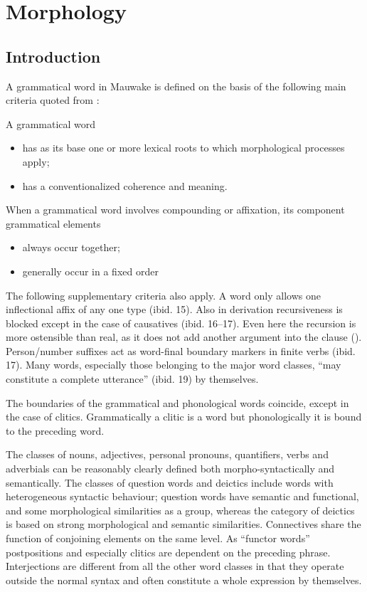 
\chapter{Morphology}\label{sec:3}
{}
\section{Introduction}\label{sec:3:1}
{}
A grammatical word in Mauwake is defined on the basis of the following main criteria quoted from \citet[12--14]{Dixon2010b}:

A grammatical word
\begin{itemize}
\item has as its base one or more lexical roots to which morphological processes apply;
\item has a conventionalized coherence and meaning.
\end{itemize}
When a grammatical word involves compounding or affixation, its component grammatical elements 

\begin{itemize}
\item always occur together;
\item generally occur in a fixed order
\end{itemize}

The following supplementary criteria also apply. A word only allows one inflectional affix of any one type (ibid. 15). Also in derivation recursiveness is blocked except in the case of causatives (ibid. 16--17). Even here the recursion is more ostensible than real, as it does not add another argument into the clause (). Person/number suffixes act as word-final boundary markers in finite verbs (ibid. 17). Many words, especially those belonging to the major word classes, ``may constitute a complete utterance'' (ibid. 19) by themselves. 

The boundaries of the grammatical and phonological words coincide, except in the case of clitics. Grammatically a clitic is a word but phonologically it is bound to the preceding word.

The classes of nouns, adjectives, personal pronouns, quantifiers, verbs and adverbials can be reasonably clearly defined both morpho-syntactically and semantically. The classes of question words and deictics include words with heterogeneous syntactic behaviour; question words have semantic and functional, and some morphological similarities as a group, whereas the category of deictics is based on strong morphological and semantic similarities. Connectives share the function of conjoining elements on the same level. As ``functor words'' postpositions and especially clitics are dependent on the preceding phrase. Interjections are different from all the other word classes in that they operate outside the normal syntax and often constitute a whole expression by themselves.


